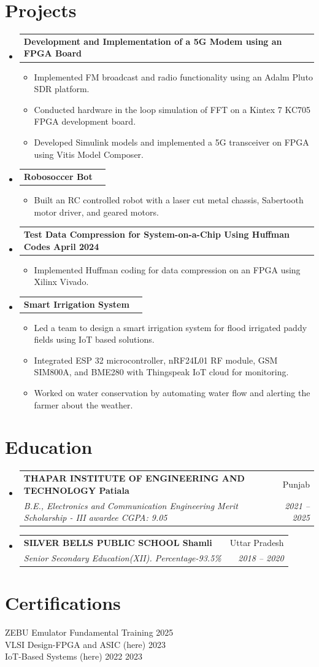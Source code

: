 \documentclass[letterpaper,11pt]{article}
\makeatletter
\newcommand{\resumeItem}[1]{\item\small{#1 \vspace{-2pt}}}
\newcommand{\resumeSubheading}[4]{
  \vspace{-2pt}\item
    \begin{tabular*}{\textwidth}[t]{l@{\extracolsep{\fill}}r}
      \textbf{#1} & #2 \\
      \textit{\small#3} & \textit{\small #4} \\
    \end{tabular*}\vspace{-7pt}
}
\newcommand{\resumeProjectHeading}[2]{
    \item
    \begin{tabular*}{\textwidth}{l@{\extracolsep{\fill}}r}
      \small#1 & #2 \\
    \end{tabular*}\vspace{-7pt}
}
\newcommand{\resumeSubHeadingListStart}{\begin{itemize}[leftmargin=0.15in, label={}]}
\newcommand{\resumeSubHeadingListEnd}{\end{itemize}}
\newcommand{\resumeItemListStart}{\begin{itemize}}
\newcommand{\resumeItemListEnd}{\end{itemize}\vspace{-5pt}}
\makeatother
\begin{document}
\section{Projects}
\resumeSubHeadingListStart
  \resumeProjectHeading
    {\textbf{ Development and Implementation of a 5G Modem using an FPGA Board }}{  }
    \resumeItemListStart
      \resumeItem{ Implemented FM broadcast and radio functionality using an Adalm Pluto SDR platform. }
      \resumeItem{ Conducted hardware in the loop simulation of FFT on a Kintex 7 KC705 FPGA development board. }
      \resumeItem{ Developed Simulink models and implemented a 5G transceiver on FPGA using Vitis Model Composer. }
    \resumeItemListEnd
  \resumeProjectHeading
    {\textbf{ Robosoccer Bot }}{  }
    \resumeItemListStart
      \resumeItem{ Built an RC controlled robot with a laser cut metal chassis, Sabertooth motor driver, and geared motors. }
    \resumeItemListEnd
  \resumeProjectHeading
    {\textbf{ Test Data Compression for System-on-a-Chip Using Huffman Codes April 2024 }}{  }
    \resumeItemListStart
      \resumeItem{ Implemented Huffman coding for data compression on an FPGA using Xilinx Vivado. }
    \resumeItemListEnd
  \resumeProjectHeading
    {\textbf{ Smart Irrigation System }}{  }
    \resumeItemListStart
      \resumeItem{ Led a team to design a smart irrigation system for flood irrigated paddy fields using IoT based solutions. }
      \resumeItem{ Integrated ESP 32 microcontroller, nRF24L01 RF module, GSM SIM800A, and BME280 with Thingspeak IoT cloud for monitoring. }
      \resumeItem{ Worked on water conservation by automating water flow and alerting the farmer about the weather. }
    \resumeItemListEnd
\resumeSubHeadingListEnd

\section{Education}
\resumeSubHeadingListStart
  \resumeSubheading
    { THAPAR INSTITUTE OF ENGINEERING AND TECHNOLOGY Patiala }{ Punjab }
    { B.E., Electronics and Communication Engineering \textbar{} Merit Scholarship - III awardee \textbar{} CGPA: 9.05 }
    { 2021 -- 2025 }
  \resumeSubheading
    { SILVER BELLS PUBLIC SCHOOL Shamli }{ Uttar Pradesh }
    { Senior Secondary Education(XII). Percentage-93.5\% }
    { 2018 -- 2020 }
\resumeSubHeadingListEnd

\section{Certifications}
\begin{itemize}[leftmargin=0.15in, label={}]
  \small{\item{
    ZEBU Emulator Fundamental Training 2025 \\
    VLSI Design-FPGA and ASIC (here) 2023 \\
    IoT-Based Systems (here) 2022 2023 \\
  }}
\end{itemize}
\end{document}
